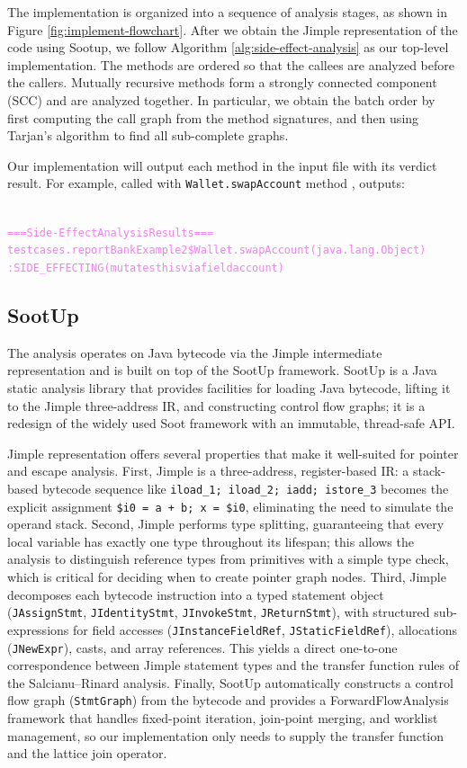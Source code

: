 \documentclass{article}
\begin{document}
The implementation is organized into a sequence of analysis stages, as shown in Figure \ref{fig:implement-flowchart}. After we obtain the Jimple representation of the code using Sootup, we follow Algorithm \ref{alg:side-effect-analysis} as our top-level implementation. The methods are ordered so that the callees are analyzed before the callers. Mutually recursive methods form a strongly connected component (SCC) and are analyzed together. In particular, we obtain the batch order by first computing the call graph from the method signatures, and then using Tarjan's algorithm to find all sub-complete graphs.


Our implementation will output each method in the input file with its verdict result. For example, called with \texttt{Wallet.swapAccount} method , outputs:

\begin{alltt} 
\textcolor{violet}{
=== Side-Effect Analysis Results ===
testcases.reportBankExample2\$Wallet.swapAccount(java.lang.Object)         
                    : SIDE_EFFECTING (mutates this via field account)}
\end{alltt}

\subsection{SootUp}

 The analysis operates on Java bytecode via the Jimple intermediate representation and is built on top of the SootUp framework. SootUp is a Java static analysis library that 
  provides facilities for loading Java bytecode, lifting it to the Jimple three-address IR, and constructing control flow graphs; it is a redesign of the widely used Soot framework with an immutable, thread-safe API. 
  
   Jimple representation offers several properties that make it well-suited for pointer and escape analysis. First, Jimple is a three-address, register-based IR: a stack-based bytecode sequence like \texttt{iload\_1; iload\_2; iadd; istore\_3} becomes the explicit assignment \texttt{\$i0 = a + b; x = \$i0}, eliminating the need
  to simulate the operand stack. Second, Jimple performs type splitting, guaranteeing that every local variable has exactly one type throughout its lifespan; this allows the analysis to distinguish reference types from primitives with a simple type check, which is critical for deciding when to create pointer graph nodes. Third, Jimple decomposes each bytecode instruction into a typed statement object (\texttt{JAssignStmt}, \texttt{JIdentityStmt}, \texttt{JInvokeStmt}, \texttt{JReturnStmt}), with structured sub-expressions for field accesses (\texttt{JInstanceFieldRef},
  \texttt{JStaticFieldRef}), allocations (\texttt{JNewExpr}), casts, and array references. This yields a direct one-to-one correspondence between Jimple statement types and the transfer function rules
   of the Salcianu--Rinard analysis. Finally, SootUp automatically constructs a control flow graph (\texttt{StmtGraph}) from the bytecode and provides a ForwardFlowAnalysis framework that handles fixed-point iteration, join-point merging, and worklist management, so our implementation only needs to supply the transfer function and the lattice join operator.
\end{document}
